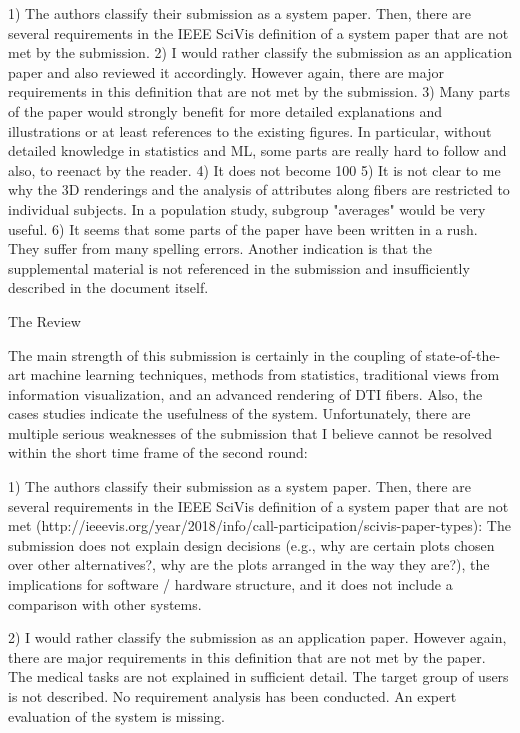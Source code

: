     1) The authors classify their submission as a system paper. Then, there are
    several requirements in the IEEE SciVis definition of a system paper that are not
    met by the submission.
    2) I would rather classify the submission as an application paper and also
    reviewed it accordingly. However again, there are major requirements in this
    definition that are not met by the submission.
    3) Many parts of the paper would strongly benefit for more detailed explanations
    and illustrations or at least references to the existing figures. In particular,
    without detailed knowledge in statistics and ML, some parts are really hard to
    follow and also, to reenact by the reader.
    4) It does not become 100%
    5) It is not clear to me why the 3D renderings and the analysis of attributes
    along fibers are restricted to individual subjects. In a population study,
    subgroup "averages" would be very useful.
    6) It seems that some parts of the paper have been written in a rush. They suffer
    from many spelling errors. Another indication is that the supplemental material is
    not referenced in the submission and insufficiently described in the document
    itself.

  The Review

    The main strength of this submission is certainly in the coupling of state-of-the-
    art machine learning techniques, methods from statistics, traditional views from
    information visualization, and an advanced rendering of DTI fibers. Also, the
    cases studies indicate the usefulness of the system. Unfortunately, there are
    multiple serious weaknesses of the submission that I believe cannot be resolved
    within the short time frame of the second round:

    1) The authors classify their submission as a system paper. Then, there are
    several requirements in the IEEE SciVis definition of a system paper that are not
    met (http://ieeevis.org/year/2018/info/call-participation/scivis-paper-types): The
    submission does not explain design decisions (e.g., why are certain plots chosen
    over other alternatives?, why are the plots arranged in the way they are?), the
    implications for software / hardware structure, and it does not include a
    comparison with other systems.

    2) I would rather classify the submission as an application paper. However again,
    there are major requirements in this definition that are not met by the paper. The
    medical tasks are not explained in sufficient detail. The target group of users is
    not described. No requirement analysis has been conducted. An expert evaluation of
    the system is missing.

